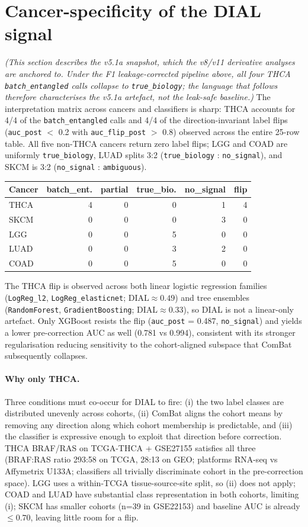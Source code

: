 \documentclass[11pt,a4paper]{article}
\begin{document}
\section{Cancer-specificity of the DIAL signal}
\emph{(This section describes the v5.1a snapshot, which the v8/v11
derivative analyses are anchored to. Under the F1 leakage-corrected
pipeline above, all four THCA \texttt{batch\_entangled} calls collapse
to \texttt{true\_biology}; the language that follows therefore
characterises the v5.1a artefact, not the leak-safe baseline.)}
The interpretation matrix across cancers and classifiers is sharp: THCA accounts for 4/4 of the \texttt{batch\_entangled} calls and 4/4 of the direction-invariant label flips (\texttt{auc\_post} $<$ 0.2 with \texttt{auc\_flip\_post} $>$ 0.8) observed across the entire 25-row table. All five non-THCA cancers return zero label flips; LGG and COAD are uniformly \texttt{true\_biology}, LUAD splits 3:2 (\texttt{true\_biology} : \texttt{no\_signal}), and SKCM is 3:2 (\texttt{no\_signal} : \texttt{ambiguous}).

\begin{tabular}{lrrrrr}\toprule
Cancer & batch\_ent. & partial & true\_bio. & no\_signal & flip \\ \midrule
THCA & 4 & 0 & 0 & 1 & 4 \\
SKCM & 0 & 0 & 0 & 3 & 0 \\
LGG & 0 & 0 & 5 & 0 & 0 \\
LUAD & 0 & 0 & 3 & 2 & 0 \\
COAD & 0 & 0 & 5 & 0 & 0 \\
\bottomrule\end{tabular}

The THCA flip is observed across both linear logistic regression families (\texttt{LogReg\_l2}, \texttt{LogReg\_elasticnet}; $\mathrm{DIAL} \approx 0.49$) and tree ensembles (\texttt{RandomForest}, \texttt{GradientBoosting}; $\mathrm{DIAL} \approx 0.33$), so DIAL is not a linear-only artefact. Only XGBoost resists the flip (\texttt{auc\_post} = 0.487, \texttt{no\_signal}) and yields a lower pre-correction AUC as well (0.781 vs 0.994), consistent with its stronger regularisation reducing sensitivity to the cohort-aligned subspace that ComBat subsequently collapses.

\paragraph{Why only THCA.} Three conditions must co-occur for DIAL to fire: (i) the two label classes are distributed unevenly across cohorts, (ii) ComBat aligns the cohort means by removing any direction along which cohort membership is predictable, and (iii) the classifier is expressive enough to exploit that direction before correction. THCA BRAF/RAS on TCGA-THCA + GSE27155 satisfies all three (BRAF:RAS ratio 293:58 on TCGA, 28:13 on GEO; platforms RNA-seq vs Affymetrix U133A; classifiers all trivially discriminate cohort in the pre-correction space). LGG uses a within-TCGA tissue-source-site split, so (ii) does not apply; COAD and LUAD have substantial class representation in both cohorts, limiting (i); SKCM has smaller cohorts (n=39 in GSE22153) and baseline AUC is already $\le 0.70$, leaving little room for a flip.
\end{document}
